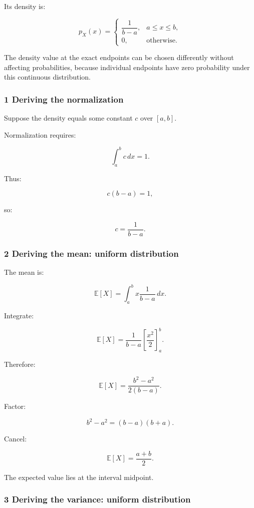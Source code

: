 Its density is:

\[
 \boxed{ p_X(x)= \begin{cases} \dfrac1{b-a},&a\le x\le b,\\ 0,&\text{otherwise}. \end{cases} }
\]

The density value at the exact endpoints can be chosen differently without affecting probabilities, because individual endpoints have zero probability under this continuous distribution.

\subsubsection{1 Deriving the normalization}\label{02-foundations-ii-ch023-deriving-the-normalization}

Suppose the density equals some constant \(c\) over \([a,b]\).

Normalization requires:

\[
 \int_a^bc\,dx=1.
\]

Thus:

\[
 c(b-a)=1,
\]

so:

\[
 \boxed{c=\frac1{b-a}}.
\]

\subsubsection{2 Deriving the mean: uniform distribution}\label{02-foundations-ii-ch023-deriving-the-mean-uniform-distribution}

The mean is:

\[
 \mathbb E[X] = \int_a^b x\frac1{b-a}\,dx.
\]

Integrate:

\[
 \mathbb E[X] = \frac1{b-a} \left[\frac{x^2}{2}\right]_a^b.
\]

Therefore:

\[
 \mathbb E[X] = \frac{b^2-a^2}{2(b-a)}.
\]

Factor:

\[
 b^2-a^2=(b-a)(b+a).
\]

Cancel:

\[
 \boxed{ \mathbb E[X]=\frac{a+b}{2} }.
\]

The expected value lies at the interval midpoint.

\subsubsection{3 Deriving the variance: uniform distribution}\label{02-foundations-ii-ch023-deriving-the-variance-uniform-distribution}

